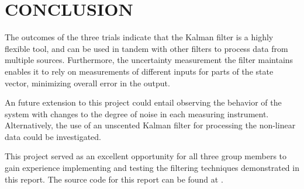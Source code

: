 \documentclass{article}
\begin{document}
\section{CONCLUSION}
\label{sec:conclusion}

The outcomes of the three trials indicate that the Kalman filter is a highly flexible tool, and can be used in tandem with other filters to process data from multiple sources. Furthermore, the uncertainty measurement the filter maintains enables it to rely on measurements of different inputs for parts of the state vector, minimizing overall error in the output.

An future extension to this project could entail observing the behavior of the system with changes to the degree of noise in each measuring instrument. Alternatively, the use of an unscented Kalman filter for processing the non-linear data could be investigated. 

This project served as an excellent opportunity for all three group members to gain experience implementing and testing the filtering techniques demonstrated in this report. The source code for this report can be found at \cite{gordon20}.








\end{document}
